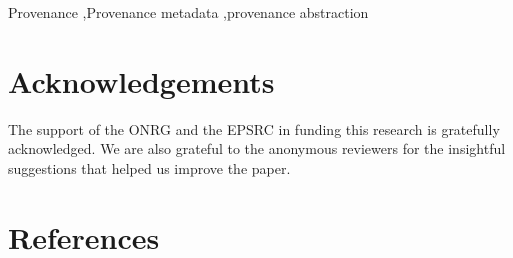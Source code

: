 \documentclass{elsarticle}
\begin{document}
\begin{keyword}
Provenance \sep Provenance metadata \sep provenance abstraction 
\end{keyword}

\maketitle


 


%




%



%

%



\section*{Acknowledgements}

The support of the ONRG and the EPSRC in funding this research is gratefully acknowledged. We are also grateful to the anonymous reviewers for the insightful suggestions that helped us improve the paper.

\section*{References}





%
%
\end{document}
